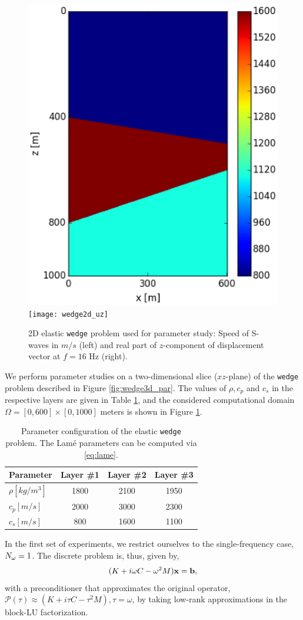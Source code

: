 \begin{figure}[H]
  \includegraphics[width=0.49\columnwidth]{wedge2d_cs} \hfill
  \texttt{[image: wedge2d\_uz]}
\caption{2D elastic \texttt{wedge} problem used for parameter study: Speed of S-waves in $m/s$ (left) and real part of $z$-component of displacement vector at $f = 16$ Hz (right).}
\label{fig:wedge2d}
\end{figure}

We perform parameter studies on a two-dimensional slice ($xz$-plane) of the \texttt{wedge} problem described in Figure \ref{fig:wedge3d_par}. The values of $\rho, c_p$ and $c_s$ in the respective layers are given in Table \ref{tab_params}, and the considered computational domain $\Omega = [0,600] \times [0,1000]$ meters is shown in Figure \ref{fig:wedge2d}.

\begin{table}[ht]
\centering
 \caption{Parameter configuration of the elastic \texttt{wedge} problem. The Lam\'e parameters can be computed via \eqref{eq:lame}.} \label{tab_params} 
 \begin{tabular}{|l|c|c|c|}
 \hline
  Parameter & Layer \#1 & Layer \#2 & Layer \#3 \\
  \hline
  $\rho [kg/m^3]$ & 1800& 2100&1950 \\
  $c_p [m/s]$ & 2000&3000 & 2300\\
  $c_s [m/s]$ & \phantom{0}800&1600&1100 \\
  \hline
 \end{tabular}
\end{table}

In the first set of experiments, we restrict ourselves to the single-frequency case, ${N_{\omega}} = 1$. The discrete problem is, thus, given by,
\begin{align*}
 (K + i \omega C - \omega^2 M) {\mathbf{x}} = \mathbf{b},
\end{align*}
with a preconditioner that approximates the original operator, $\mathcal{P}(\tau) \approx (K + i \tau C - \tau^2M),  \tau = \omega$, by taking low-rank approximations in the block-LU factorization.  

